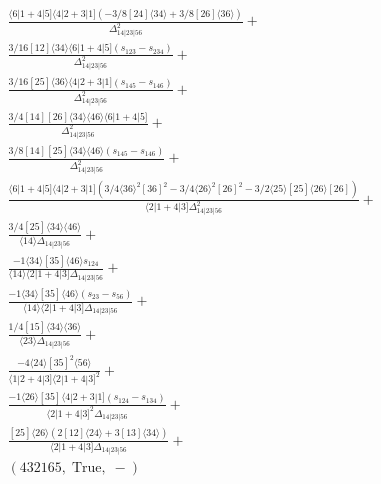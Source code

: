 \documentclass[varwidth, border=5pt]{standalone}
\begin{document}
\begin{my}
$\begin{gathered}
\scriptscriptstyle\frac{⟨6|1+4|5]⟨4|2+3|1](-3/8[24]⟨34⟩+3/8[26]⟨36⟩)}{Δ_{14|23|56}^2}+\\
\scriptscriptstyle\frac{3/16[12]⟨34⟩⟨6|1+4|5](s_{123}-s_{234})}{Δ_{14|23|56}^2}+\\
\scriptscriptstyle\frac{3/16[25]⟨36⟩⟨4|2+3|1](s_{145}-s_{146})}{Δ_{14|23|56}^2}+\\
\scriptscriptstyle\frac{3/4[14][26]⟨34⟩⟨46⟩⟨6|1+4|5]}{Δ_{14|23|56}^2}+\\
\scriptscriptstyle\frac{3/8[14][25]⟨34⟩⟨46⟩(s_{145}-s_{146})}{Δ_{14|23|56}^2}+\\
\scriptscriptstyle\frac{⟨6|1+4|5]⟨4|2+3|1](3/4⟨36⟩^2[36]^2-3/4⟨26⟩^2[26]^2-3/2⟨25⟩[25]⟨26⟩[26])}{⟨2|1+4|3]Δ_{14|23|56}^2}+\\
\scriptscriptstyle\frac{3/4[25]⟨34⟩⟨46⟩}{⟨14⟩Δ_{14|23|56}}+\\
\scriptscriptstyle\frac{-1⟨34⟩[35]⟨46⟩s_{124}}{⟨14⟩⟨2|1+4|3]Δ_{14|23|56}}+\\
\scriptscriptstyle\frac{-1⟨34⟩[35]⟨46⟩(s_{23}-s_{56})}{⟨14⟩⟨2|1+4|3]Δ_{14|23|56}}+\\
\scriptscriptstyle\frac{1/4[15]⟨34⟩⟨36⟩}{⟨23⟩Δ_{14|23|56}}+\\
\scriptscriptstyle\frac{-4⟨24⟩[35]^2⟨56⟩}{⟨1|2+4|3]⟨2|1+4|3]^2}+\\
\scriptscriptstyle\frac{-1⟨26⟩[35]⟨4|2+3|1](s_{124}-s_{134})}{⟨2|1+4|3]^2Δ_{14|23|56}}+\\
\scriptscriptstyle\frac{[25]⟨26⟩(2[12]⟨24⟩+3[13]⟨34⟩)}{⟨2|1+4|3]Δ_{14|23|56}}+\\
\scriptscriptstyle(432165,\;\text{True},\;-)\phantom{+}
\end{gathered}$
\end{my}
\end{document}
